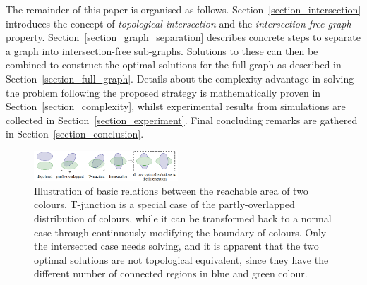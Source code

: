 \documentclass[journal]{IEEEtran}
\begin{document}
The remainder of this paper is organised as follows. Section~\ref{section_intersection} introduces the concept of \textit{topological intersection} and the \textit{intersection-free graph} property.
Section~\ref{section_graph_separation} describes concrete steps to separate a graph into intersection-free sub-graphs. 
Solutions to these can then be combined to construct the optimal solutions for the full graph as described in Section~\ref{section_full_graph}. Details  about the complexity advantage in solving the problem following the proposed strategy is mathematically proven in Section~\ref{section_complexity}, whilst experimental results from simulations are collected in Section~\ref{section_experiment}. Final concluding remarks are gathered in Section~\ref{section_conclusion}.

\begin{figure}[t]
\centering
\includegraphics[width = 0.48\textwidth]{figures/basic_shape_3}
\caption{Illustration of basic relations between the reachable area of two colours. T-junction is a special case of the partly-overlapped distribution of colours, while it can be transformed back to a normal case through continuously modifying the boundary of colours. Only the intersected case needs solving, and it is apparent that the two optimal solutions are not topological equivalent, since they have the different number of connected regions in blue and green colour. }\label{fig:basic_shape}
\end{figure}
\end{document}
